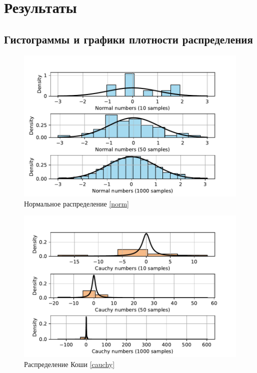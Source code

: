 \documentclass[a4paper]{article}
\begin{document}
\section{Результаты}
\subsection{Гистограммы и графики плотности распределения}
\begin{figure}[H]
    \centering
    \includegraphics[width = 16 cm]{resources/normalNumbers.pdf}
    \caption{Нормальное распределение \eqref{norm}}
    \label{fig:norm}
\end{figure}
\begin{figure}[H]
    \centering
    \includegraphics[width = 16 cm]{resources/cauchyNumbers.pdf}
    \caption{Распределение Коши \eqref{cauchy}}
    \label{fig:cauchy}
\end{figure}
\end{document}
